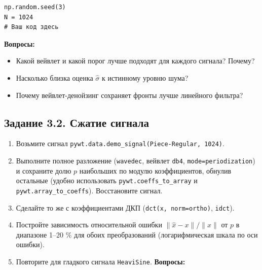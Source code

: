 \documentclass[12pt,a4paper,openany]{book}
\providecommand{\tightlist}{\setlength{\itemsep}{0pt}\setlength{\parskip}{0pt}}
\begin{document}
\begin{Verbatim}[fontsize=\small, breaklines, breakanywhere, frame=single, framesep=2mm]
np.random.seed(3)
N = 1024
# Ваш код здесь
\end{Verbatim}

\textbf{Вопросы:}

\begin{itemize}
\tightlist
\item
  Какой вейвлет и какой порог лучше подходят для каждого сигнала? Почему?
\item
  Насколько близка оценка \(\hat\sigma\) к истинному уровню шума?
\item
  Почему вейвлет-денойзинг сохраняет фронты лучше линейного фильтра?
\end{itemize}

\subsection*{Задание 3.2. Сжатие сигнала}

\begin{enumerate}
\def\labelenumi{\arabic{enumi}.}
\tightlist
\item
  Возьмите сигнал \texttt{pywt.\allowbreak{}data.\allowbreak{}demo\_\allowbreak{}signal(\allowbreak{}\textquotesingle{}\allowbreak{}Piece-Regular\textquotesingle{}\allowbreak{},\allowbreak{}\ 1024)}.
\item
  Выполните полное разложение (\texttt{wavedec}, вейвлет \texttt{db4}, \texttt{mode=\allowbreak{}\textquotesingle{}\allowbreak{}periodization\textquotesingle{}\allowbreak{}}) и сохраните долю \(p\) наибольших по модулю коэффициентов, обнулив остальные (удобно использовать \texttt{pywt.\allowbreak{}coeffs\_\allowbreak{}to\_\allowbreak{}array} и \texttt{pywt.\allowbreak{}array\_\allowbreak{}to\_\allowbreak{}coeffs}). Восстановите сигнал.
\item
  Сделайте то же с коэффициентами ДКП (\texttt{dct(\allowbreak{}x,\allowbreak{}\ norm=\allowbreak{}\textquotesingle{}\allowbreak{}ortho\textquotesingle{}\allowbreak{})}, \texttt{idct}).
\item
  Постройте зависимость относительной ошибки \(\|\hat x - x\|/\|x\|\) от \(p\) в диапазоне 1--20 \% для обоих преобразований (логарифмическая шкала по оси ошибки).
\item
  Повторите для гладкого сигнала \texttt{\textquotesingle{}\allowbreak{}HeaviSine\textquotesingle{}\allowbreak{}}.
  \textbf{Вопросы:}
\end{enumerate}
\end{document}
